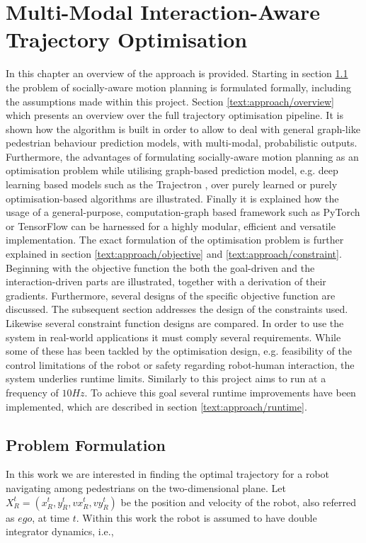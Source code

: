 \chapter{Multi-Modal Interaction-Aware Trajectory Optimisation}
\label{text:approach}
In this chapter an overview of the approach is provided. Starting in section \ref{text:approach/formulation} the problem of socially-aware motion planning is formulated formally, including the assumptions made within this project. 
\newline
Section \ref{text:approach/overview} which presents an overview over the full trajectory optimisation pipeline. It is shown how the algorithm is built in order to allow to deal with general graph-like pedestrian behaviour prediction models, with multi-modal, probabilistic outputs. Furthermore, the advantages of formulating socially-aware motion planning as an optimisation problem while utilising graph-based prediction model, e.g. deep learning based models such as the Trajectron \cite{Ivanovic18}, over purely learned \cite{Chen2017} or purely optimisation-based \cite{Berg2011} algorithms are illustrated. Finally it is explained how the usage of a general-purpose, computation-graph based framework such as PyTorch \cite{pytorch} or TensorFlow \cite{tensorflow} can be harnessed for a highly modular, efficient and versatile implementation.
\newline
The exact formulation of the optimisation problem is further explained in section \ref{text:approach/objective} and \ref{text:approach/constraint}. Beginning with the objective function the both the goal-driven and the interaction-driven parts are illustrated, together with a derivation of their gradients. Furthermore, several designs of the specific objective function are discussed. The subsequent section addresses the design of the constraints used. Likewise several constraint function designs are compared. 
\newline
In order to use the system in real-world applications it must comply several requirements. While some of these has been tackled by the optimisation design, e.g. feasibility of the control limitations of the robot or safety regarding robot-human interaction, the system underlies runtime limits. Similarly to \cite{Chen2017} this project aims to run at a frequency of $10 Hz$. To achieve this goal several runtime improvements have been implemented, which are described in section \ref{text:approach/runtime}.


\section{Problem Formulation}
\label{text:approach/formulation}
In this work we are interested in finding the optimal trajectory for a robot navigating among pedestrians on the two-dimensional plane. Let $X_R^t = (x_R^t, y_R^t, vx_R^t, vy_R^t)$ be the position and velocity of the robot, also referred as $ego$, at time $t$. Within this work the robot is assumed to have double integrator dynamics, i.e., 

